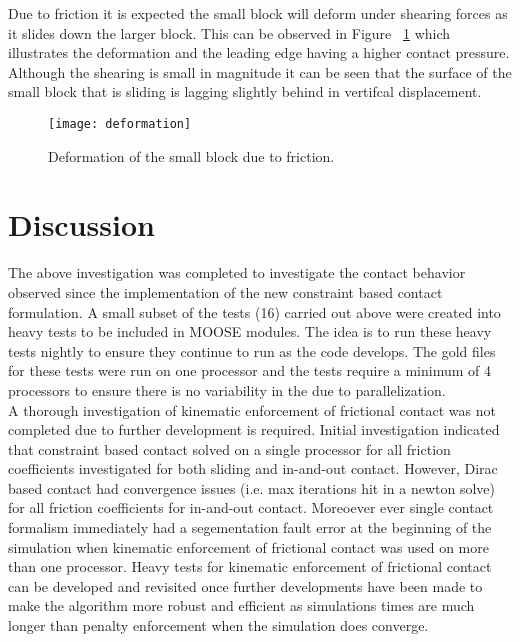 \documentclass[]{article}
\begin{document}
\noindent Due to friction it is expected the small block will deform under shearing forces as it slides down the larger block.  This can be observed in Figure ~\ref{fig:deformation} which illustrates the deformation and the leading edge having a higher contact pressure.  Although the shearing is small in magnitude it can be seen that the surface of the small block that is sliding is lagging slightly behind in vertifcal displacement.

\begin{figure}[H]
   \centering
   \texttt{[image: deformation]}
   \caption{Deformation of the small block due to friction.}
   \label{fig:deformation}
\end{figure}

\section{Discussion}
\label{discussion}

\noindent The above investigation was completed to investigate the contact behavior observed since the implementation of the new constraint based contact formulation.  A small subset of the tests (16) carried out above were created into heavy tests to be included in MOOSE modules.  The idea is to run these heavy tests nightly to ensure they continue to run as the code develops.  The gold files for these tests were run on one processor and the tests require a minimum of 4 processors to ensure there is no variability in the due to parallelization. \\

\noindent A thorough investigation of kinematic enforcement of frictional contact was not completed due to further development is required.  Initial investigation indicated that constraint based contact solved on a single processor for all friction coefficients investigated for both sliding and in-and-out contact.  However, Dirac based contact had convergence issues (i.e. max iterations hit in a newton solve) for all friction coefficients for in-and-out contact.  Moreoever ever single contact formalism immediately had a segementation fault error at the beginning of the simulation when kinematic enforcement of frictional contact was used on more than one processor.  Heavy tests for kinematic enforcement of frictional contact can be developed and revisited once further developments have been made to make the algorithm more robust and efficient as simulations times are much longer than penalty enforcement when the simulation does converge.
\end{document}

